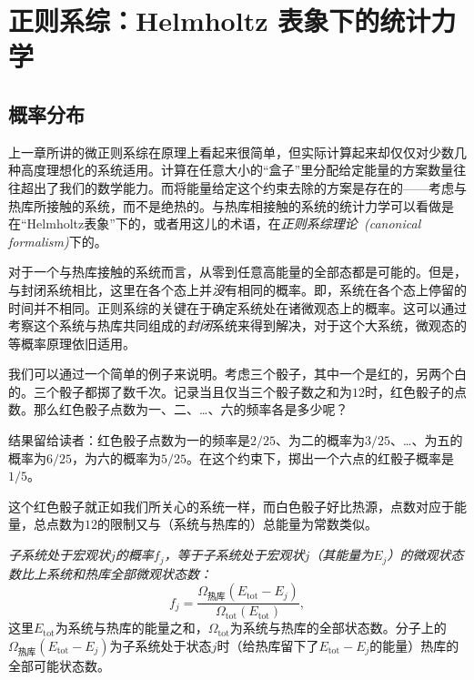 \chapter{正则系综：Helmholtz 表象下的统计力学}\label{chap16}
\section{概率分布}\label{sec16.1}
上一章所讲的微正则系综在原理上看起来很简单，但实际计算起来却仅仅对少数几种高度理想化的系统适用。计算在任意大小的“盒子”里分配给定能量的方案数量往往超出了我们的数学能力。而将能量给定这个约束去除的方案是存在的——考虑与热库所接触的系统，而不是绝热的。与热库相接触的系统的统计力学可以看做是在“Helmholtz表象”下的，或者用这儿的术语，在{\it 正则系综理论~(canonical formalism)}下的。

对于一个与热库接触的系统而言，从零到任意高能量的全部态都是可能的。但是，与封闭系统相比，这里在各个态上并{\it 没}有相同的概率。即，系统在各个态上停留的时间并不相同。正则系综的关键在于确定系统处在诸微观态上的概率。这可以通过考察这个系统与热库共同组成的{\it 封闭}系统来得到解决，对于这个大系统，微观态的等概率原理依旧适用。

我们可以通过一个简单的例子来说明。考虑三个骰子，其中一个是红的，另两个白的。三个骰子都掷了数千次。记录当且仅当三个骰子数之和为$12$时，红色骰子的点数。那么红色骰子点数为一、二、\dots 、六的频率各是多少呢？

结果留给读者：红色骰子点数为一的频率是$2/25$、为二的概率为$3/25$、\dots 、为五的概率为$6/25$，为六的概率为$5/25$。在这个约束下，掷出一个六点的红骰子概率是$1/5$。

这个红色骰子就正如我们所关心的系统一样，而白色骰子好比热源，点数对应于能量，总点数为$12$的限制又与（系统与热库的）总能量为常数类似。

{\it 子系统处于宏观状$j$的概率$f_j$，等于子系统处于宏观状$j$（其能量为$E_j$）的微观状态数比上系统和热库全部微观状态数：}
\begin{equation}
f_j = \frac{\Omega_\text{热库}(E_\text{tot}-E_j)}{\Omega_\text{tot}(E_\text{tot})},
\end{equation}
这里$E_\text{tot}$为系统与热库的能量之和，$\Omega_\text{tot}$为系统与热库的全部状态数。分子上的$\Omega_\text{热库}(E_\text{tot}-E_j)$为子系统处于状态$j$时（给热库留下了$E_\text{tot}-E_j$的能量）热库的全部可能状态数。

